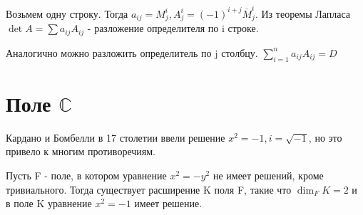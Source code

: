 \begin{corollary}
	Возьмем одну строку. Тогда \(a_{ij} = M_j^i, A_j^i = (-1)^{i+j}\overline{M}^i_j\). Из теоремы Лапласа \(\det A = \sum a_{ij}A_{ij}\) - разложение определителя по i строке.
\end{corollary}
\begin{corollary}
	Аналогично можно разложить определитель по j столбцу. \(\sum_{i=1}^{n}a_{ij}A_{ij}=D\)
\end{corollary}
\section{Поле \(\mathbb{C}\)}
Кардано и Бомбелли в 17 столетии ввели решение \(x^2=-1, i = \sqrt{-1}\), но это привело к многим противоречиям.
\begin{theorem}
	Пусть F - поле, в котором уравнение \(x^2=-y^2\) не имеет решений, кроме тривиального. Тогда существует расширение K поля F, такие что \(\dim_FK=2\) и в поле K уравнение \(x^2=-1\) имеет решение.
\end{theorem}
